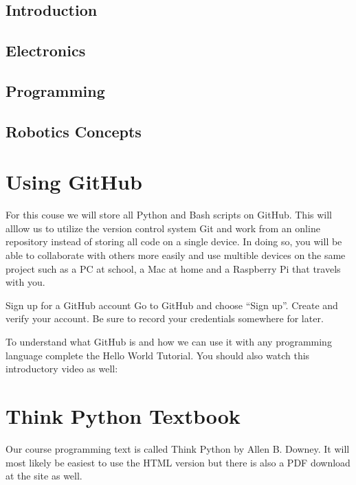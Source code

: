 \documentclass[
]{book}
\begin{document}
\hypertarget{introduction}{%
\subsection{Introduction}\label{introduction}}

\hypertarget{electronics}{%
\subsection{Electronics}\label{electronics}}

\hypertarget{programming}{%
\subsection{Programming}\label{programming}}

\hypertarget{robotics-concepts}{%
\subsection{Robotics Concepts}\label{robotics-concepts}}

\hypertarget{using-github}{%
\section{Using GitHub}\label{using-github}}

For this couse we will store all Python and Bash scripts on GitHub. This will alllow us to utilize the version control system Git and work from an online repository instead of storing all code on a single device. In doing so, you will be able to collaborate with others more easily and use multible devices on the same project such as a PC at school, a Mac at home and a Raspberry Pi that travels with you.

Sign up for a GitHub account
Go to GitHub and choose ``Sign up''. Create and verify your account. Be sure to record your credentials somewhere for later.

To understand what GitHub is and how we can use it with any programming language complete the Hello World Tutorial. You should also watch this introductory video as well:

\hypertarget{think-python-textbook}{%
\section{Think Python Textbook}\label{think-python-textbook}}

Our course programming text is called Think Python by Allen B. Downey. It will most likely be easiest to use the HTML version but there is also a PDF download at the site as well.
\end{document}
